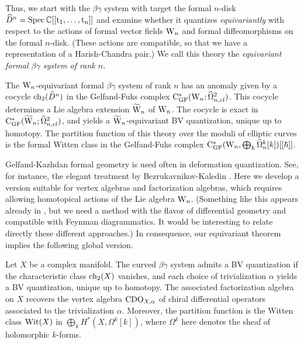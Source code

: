 Thus, we start with the $\beta\gamma$ system with target the formal $n$-disk $\widehat{D}^n = \rm{Spec}\,\mathbb C[[t_1,\ldots,t_n]]$ and examine whether it quantizes \emph{equivariantly} with respect to the actions of formal vector fields ${{\rm W}_n}$ and formal diffeomorphisms on the formal $n$-disk. (These actions are compatible, so that we have a representation of a Harish-Chandra pair.) We call this theory the \emph{equivariant formal $\beta\gamma$ system of rank $n$}.

\begin{thm*}
The ${{\rm W}_n}$-equivariant formal $\beta\gamma$ system of rank $n$ has an anomaly given by a cocycle ${\rm ch}_2(\widehat{D}^n)$ in the Gelfand-Fuks  complex ${\rm C}^*_{{\rm GF}}({{\rm W}_n} ; \widehat{\Omega}^2_{n,cl})$. This cocycle determines a Lie algebra extension $\widetilde{{{\rm W}}}_n$ of ${{\rm W}_n}$. The cocycle is exact in ${\rm C}^*_{{\rm GF}}(\widetilde{{{\rm W}}}_n ; \widehat{\Omega}^2_{n,cl})$, and yields a $\widetilde{{{\rm W}}}_n$-equivariant BV quantization, unique up to homotopy. The partition function of this theory over the moduli of elliptic curves is the formal Witten class in the Gelfand-Fuks  complex ${\rm C}^*_{{\rm GF}}({{\rm W}_n}, \bigoplus_k \widehat{\Omega}_n^k[k])[[\hbar]]$.
\end{thm*}

Gelfand-Kazhdan formal geometry is used often in deformation quantization. See, for instance, the elegant treatment by Bezrukavnikov-Kaledin \cite{BK}. Here we develop a version suitable for vertex algebras and factorization algebras, which requires allowing homotopical actions of the Lie algebra ${{\rm W}_n}$. (Something like this appears already in \cite{BD,KV,Malikov2008}, but we need a method with the flavor of differential geometry and compatible with Feynman diagrammatics. It would be interesting to relate directly these different approaches.) In consequence, our equivariant theorem implies the following global version.
 
\begin{thm*}
Let $X$ be a complex manifold. The curved $\beta\gamma$ system admits a BV quantization if the characteristic class ${\rm ch}_2(X)$ vanishes, and each choice of trivialization $\alpha$ yields a BV quantization, unique up to homotopy. The associated factorization algebra on $X$ recovers the vertex algebra ${\rm CDO}_{X,\alpha}$ of chiral differential operators associated to the trivialization $\alpha$. Moreover, the partition function is the Witten class ${\rm Wit}(X)$ in $\bigoplus_k H^*(X, \Omega^k[k])$, where $\Omega^k$ here denotes the sheaf of holomorphic $k$-forms.
\end{thm*}


